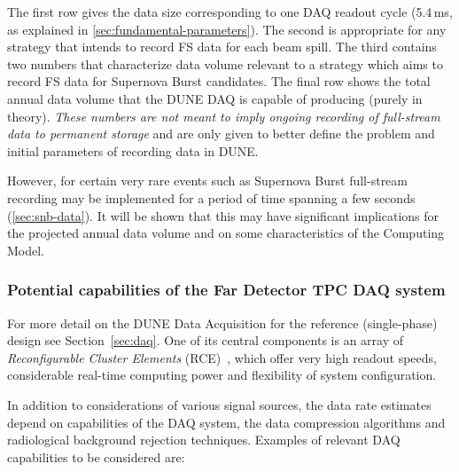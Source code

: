 The first row gives the data size corresponding to one DAQ readout cycle (5.4\,ms, as explained in \ref{sec:fundamental-parameters}).
The second is appropriate for any strategy that intends to record FS data for each beam spill.
The third contains two numbers that characterize data volume relevant to a strategy which aims
to record FS data for Supernova Burst candidates. The final row  shows the total annual data
volume that the DUNE DAQ is capable of producing (purely in theory).
\textit{These numbers are not meant to imply ongoing recording of full-stream
data to permanent storage} and are only given to better define the problem and initial parameters
of recording data in DUNE.

However, for certain very rare events such as Supernova Burst full-stream
recording may be implemented for a period of time spanning a few seconds (\ref{sec:snb-data}). It
will be shown that this may have significant implications for the projected annual data volume and
on some characteristics of the Computing Model.


\subsubsection{Potential capabilities of the Far Detector TPC DAQ system}
\label{sec:daq-assumptions}
For more detail on the DUNE Data Acquisition for the reference (single-phase) design see Section~\ref{sec:daq}.
One of its central components is an array of \textit{Reconfigurable Cluster Elements} (RCE)~\cite{slac_rce_1},
which offer very high readout speeds, considerable real-time computing power and flexibility of system configuration.

In addition to considerations of various signal sources, the data rate estimates depend on capabilities of the DAQ system,
the data compression algorithms and radiological background rejection techniques.
Examples of relevant DAQ capabilities to be considered are:

